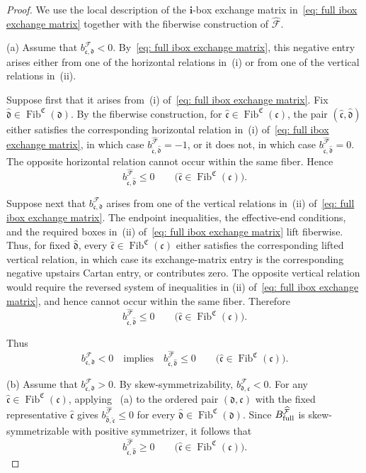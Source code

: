 \documentclass[12pt, leqno]{amsart}
\numberwithin{equation}{section}
\theoremstyle{plain}
\theoremstyle{definition}
\renewcommand{\le}{\leqslant}
\renewcommand{\ge}{\geqslant}
\newcommand{\full}{{\rm full}}
\newcommand{\Fib}{\operatorname{Fib}}
\newcommand{\frakC}{\mathfrak{C}}
\newcommand{\frakc}{\mathfrak{c}}
\newcommand{\frakd}{\mathfrak{d}}
\newcommand{\hfrakc}{\widehat{\frakc}}
\newcommand{\hfrakd}{\widehat{\frakd}}
\newcommand{\bfi}{\mathbf{i}}
\newcommand{\calF}{\mathcal{F}}
\newcommand{\hcalF}{{\widehat{\calF}}}
\begin{document}
\begin{proof}
We use the local description of the $\bfi$-box exchange matrix
in~\eqref{eq: full ibox exchange matrix} together with the fiberwise
construction of $\hcalF$.

\noindent
{\rm (a)} Assume that $b^\calF_{\frakc,\frakd}<0$.
By~\eqref{eq: full ibox exchange matrix}, this negative entry arises
either from one of the horizontal relations in~{\rm (i)} or from one
of the vertical relations in~{\rm (ii)}.

Suppose first that it arises from~{\rm (i)} of~\eqref{eq: full ibox exchange matrix}. Fix $\hfrakd\in\Fib^{\frakC}(\frakd)$.
By the fiberwise construction, for $\hfrakc\in\Fib^{\frakC}(\frakc)$,
the pair $(\hfrakc,\hfrakd)$ either satisfies the corresponding
horizontal relation in~{\rm (i)} of~\eqref{eq: full ibox exchange matrix}, in which case
$b^\hcalF_{\hfrakc,\hfrakd}=-1$, or it does not, in which case $b^\hcalF_{\hfrakc,\hfrakd}=0$.
The opposite horizontal relation cannot occur within the same fiber. Hence
\[
b^\hcalF_{\hfrakc,\hfrakd}\le 0 \qquad \bigl(\hfrakc\in\Fib^{\frakC}(\frakc)\bigr).
\]

Suppose next that $b^\calF_{\frakc,\frakd}$ arises from one of the
vertical relations in~{\rm (ii)}
of~\eqref{eq: full ibox exchange matrix}.
The endpoint inequalities,  the effective-end conditions, and the
required boxes in~{\rm (ii)}
of~\eqref{eq: full ibox exchange matrix} lift fiberwise. Thus, for
fixed $\hfrakd$, every
$\hfrakc\in\Fib^{\frakC}(\frakc)$
either satisfies the corresponding lifted vertical relation, in
which case its exchange-matrix entry is the corresponding negative
upstairs Cartan entry, or contributes zero. The opposite vertical
relation would require the reversed system of inequalities in
{\rm (ii)} of~\eqref{eq: full ibox exchange matrix}, and hence cannot
occur within the same fiber. Therefore
\[
b^\hcalF_{\hfrakc,\hfrakd}\le 0 \qquad \bigl(\hfrakc\in\Fib^{\frakC}(\frakc)\bigr).
\]

Thus
\[
b^\calF_{\frakc,\frakd}<0  \quad\text{implies}\quad b^\hcalF_{\hfrakc,\hfrakd}\le0 \qquad \bigl(\hfrakc\in\Fib^{\frakC}(\frakc)\bigr).
\]

\noindent
{\rm (b)} Assume that $b^\calF_{\frakc,\frakd}>0$.
By skew-symmetrizability,
$b^\calF_{\frakd,\frakc}<0$.
For any $\hfrakc\in\Fib^{\frakC}(\frakc)$, applying~ {\rm (a)}{}
to the ordered pair $(\frakd,\frakc)$ with the fixed representative
$\hfrakc$ gives
$b^\hcalF_{\hfrakd,\hfrakc}\le0$
for every $\hfrakd\in\Fib^{\frakC}(\frakd)$.
Since $B^\hcalF_{\full}$ is skew-symmetrizable with positive symmetrizer, it
follows that
\[
b^\hcalF_{\hfrakc,\hfrakd}\ge 0 \qquad \bigl(\hfrakc\in\Fib^{\frakC}(\frakc)\bigr).
\]


\end{proof}
\end{document}

